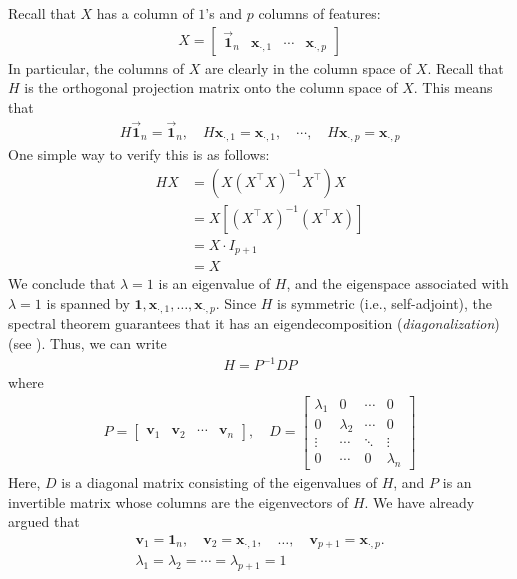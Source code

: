 \documentclass[12pt, a4paper]{article}
\theoremstyle{definition}
\begin{document}
	Recall that $X$ has a column of $1$'s and $p$ columns of features:
	\begin{align*}
		X = \begin{bmatrix}
			\vec{\mathbf{1}}_n & \mathbf{x}_{\cdot, 1} & \cdots & \mathbf{x}_{\cdot, p}
		\end{bmatrix}
	\end{align*}
	In particular, the columns of $X$ are clearly in the column space of $X$.
	Recall that $H$ is the orthogonal projection matrix onto the column space of $X$.
	This means that
	\begin{align*}
		H\vec{\mathbf{1}}_n=\vec{\mathbf{1}}_n,\quad
		H\mathbf{x}_{\cdot, 1} = \mathbf{x}_{\cdot, 1},\quad
		\cdots,\quad
		H\mathbf{x}_{\cdot, p} = \mathbf{x}_{\cdot, p}
	\end{align*}
	One simple way to verify this is as follows:
	\begin{align*}
		HX &= (X(X^\top X)^{-1}X^\top)X\\
		&=X[(X^\top X)^{-1}(X^\top X)]\\
		&=X\cdot I_{p+1}\\
		&=X
	\end{align*}
	We conclude that $\lambda=1$ is an eigenvalue of $H$, and the eigenspace associated
	with $\lambda=1$ is spanned by $\mathbf{1},\mathbf{x}_{\cdot, 1},\ldots,\mathbf{x}_{\cdot, p}$.
	Since $H$ is symmetric (i.e., self-adjoint), the spectral theorem guarantees that it has an
	eigendecomposition (\textit{diagonalization}) (see \cite{axler}). Thus, we can write
	\begin{align*}
		H = P^{-1}DP
	\end{align*}
	where
	\begin{align*}
		P=\begin{bmatrix}
			\mathbf{v}_1 & \mathbf{v}_2 & \cdots & \mathbf{v}_n
		\end{bmatrix},
		\quad
		D=\begin{bmatrix}
			\lambda_1 &0 & \cdots & 0\\
			0 & \lambda_2 & \cdots & 0\\
			\vdots & \cdots & \ddots & \vdots\\
			0 & \cdots & 0 & \lambda_n
		\end{bmatrix}
	\end{align*}
	Here, $D$ is a diagonal matrix consisting of the eigenvalues of $H$, and
	$P$ is an invertible matrix whose columns are the eigenvectors of $H$.
	We have already argued that
	\begin{align*}
		\mathbf{v}_1=\mathbf{1}_n,\quad
		\mathbf{v}_2=\mathbf{x}_{\cdot, 1},\quad
		\ldots,\quad
		\mathbf{v}_{p+1}=\mathbf{x}_{\cdot, p}.\\
		\lambda_1=\lambda_2=\cdots=\lambda_{p+1}=1
	\end{align*}
\end{document}
